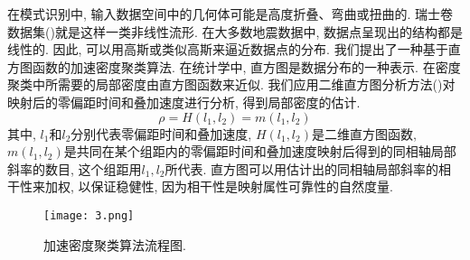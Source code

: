 在模式识别中, 输入数据空间中的几何体可能是高度折叠、弯曲或扭曲的. 瑞士卷数据集(\cite{Tenenbaum2000})就是这样一类非线性流形. 在大多数地震数据中, 数据点呈现出的结构都是线性的. 因此, 可以用高斯或类似高斯来逼近数据点的分布. 我们提出了一种基于直方图函数的加速密度聚类算法. 在统计学中, 直方图是数据分布的一种表示. 在密度聚类中所需要的局部密度由直方图函数来近似. 我们应用二维直方图分析方法(\cite{Gonzalez2002,Zhang2015})对映射后的零偏距时间和叠加速度进行分析, 得到局部密度的估计. 
\begin{equation}
    \rho=H(l_1,l_2)=m(l_1,l_2)
\end{equation}
其中, $l_1$和$l_2$分别代表零偏距时间和叠加速度, $H(l_1,l_2)$是二维直方图函数, $m(l_1,l_2)$是共同在某个组距内的零偏距时间和叠加速度映射后得到的同相轴局部斜率的数目, 这个组距用$l_1,l_2$所代表. 直方图可以用估计出的同相轴局部斜率的相干性来加权, 以保证稳健性, 因为相干性是映射属性可靠性的自然度量. 
\begin{figure}[htb]
    \centering
    \texttt{[image: 3.png]}
    \caption{加速密度聚类算法流程图. \label{fig:3}}
\end{figure}


